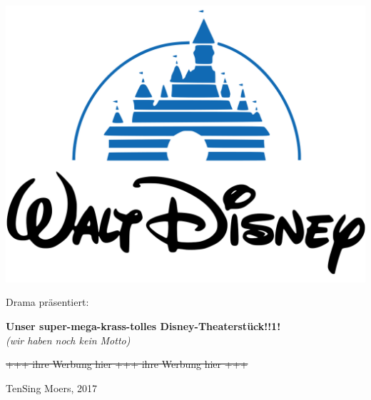 \begin{center}
\phantom{asdf}
\vspace{-2cm}
\includegraphics[scale=.3]{res/Walt_Disney_Pictures_Castle_Logo-Crop}

\vspace{-1cm}
\Huge{Drama präsentiert}:

\vspace{2cm}
\Huge\textbf{Unser super-mega-krass-tolles Disney-Theaterstück!!1!}\\
\textit{(wir haben noch kein Motto)}

\vspace{1cm}

\Large \st{+++ ihre Werbung hier +++ ihre Werbung hier +++}

\vspace{1.5cm}

\Large TenSing Moers, 2017


\end{center}


\tableofcontents

\vspace{3mm}


